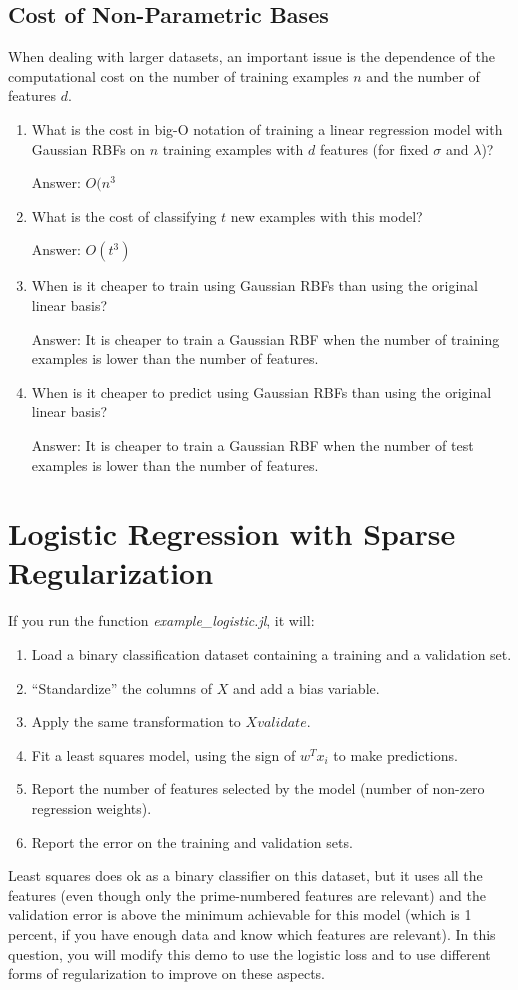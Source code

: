 \documentclass{article}
\def\ans#1{\par\gre{Answer: #1}}
\def\blu#1{{\color{blu}#1}}
\def\gre#1{{\color{gre}#1}}
\def\enum#1{\begin{enumerate}#1\end{enumerate}}
\begin{document}
\pagebreak

\subsection{Cost of Non-Parametric Bases}

When dealing with larger datasets, an important issue is the dependence of the computational cost on the number of training examples $n$ and the number of features $d$.
\blu{
\enum{
\item What is the cost in big-O notation of training a linear regression model with Gaussian RBFs on $n$ training examples with $d$ features (for fixed $\sigma$ and $\lambda$)?
\ans{$O(n^3$}
\item What is the cost of classifying $t$ new examples with this model?
\ans{$O(t^3)$}
\item When is it cheaper to train using Gaussian RBFs than using the original linear basis?
\ans{It is cheaper to train a Gaussian RBF when the number of training examples is lower than the number of features.}
\item When is it cheaper to predict using Gaussian RBFs than using the original linear basis?
\ans{It is cheaper to train a Gaussian RBF when the number of test examples is lower than the number of features.}
}}

\pagebreak

\section{Logistic Regression with Sparse Regularization}

If you run the function \emph{example\_logistic.jl}, it will:
\enum{
\item Load a binary classification dataset containing a training and a validation set.
\item ``Standardize'' the columns of $X$ and add a bias variable.
\item Apply the same transformation to $Xvalidate$.
\item Fit a least squares model, using the sign of $w^Tx_i$ to make predictions.
\item Report the number of features selected by the model (number of non-zero regression weights).
\item Report the error on the training and validation sets.
}
Least squares does ok as a binary classifier on this dataset, but it uses all the features (even though only the prime-numbered features are relevant) and the validation error is above the minimum achievable for this model (which is 1 percent, if you have enough data and know which features are relevant). In this question, you will modify this demo to use the logistic loss and to use different forms of regularization to improve on these aspects.
\end{document}
